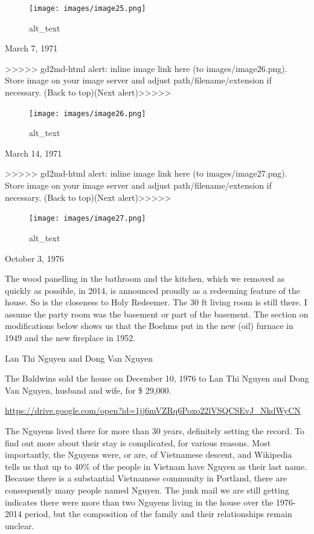 \documentclass[
  12pt,
]{book}
\begin{document}
\begin{figure}
\centering
\texttt{[image: images/image25.png]}
\caption{alt\_text}
\end{figure}

March 7, 1971

{\textgreater\textgreater\textgreater\textgreater\textgreater{} gd2md-html alert: inline image link here (to images/image26.png). Store image on your image server and adjust path/filename/extension if necessary. }(Back to top)(Next alert){\textgreater\textgreater\textgreater\textgreater\textgreater{} }

\begin{figure}
\centering
\texttt{[image: images/image26.png]}
\caption{alt\_text}
\end{figure}

March 14, 1971

{\textgreater\textgreater\textgreater\textgreater\textgreater{} gd2md-html alert: inline image link here (to images/image27.png). Store image on your image server and adjust path/filename/extension if necessary. }(Back to top)(Next alert){\textgreater\textgreater\textgreater\textgreater\textgreater{} }

\begin{figure}
\centering
\texttt{[image: images/image27.png]}
\caption{alt\_text}
\end{figure}

October 3, 1976

The wood panelling in the bathroom and the kitchen, which we removed as quickly as possible, in 2014, is announced proudly as a redeeming feature of the house. So is the closeness to Holy Redeemer. The 30 ft living room is still there. I assume the party room was the basement or part of the basement. The section on modifications below shows us that the Boehms put in the new (oil) furnace in 1949 and the new fireplace in 1952.

Lan Thi Nguyen and Dong Van Nguyen

The Baldwins sold the house on December 10, 1976 to Lan Thi Nguyen and Dong Van Nguyen, husband and wife, for \$ 29,000.

\url{https://drive.google.com/open?id=1jj6mVZRq6Poxo22lVSQCSEvJ_NkdWyCN}

The Nguyens lived there for more than 30 years, definitely setting the record. To find out more about their stay is complicated, for various reasons. Most importantly, the Nguyens were, or are, of Vietnamese descent, and Wikipedia tells us that up to 40\% of the people in Vietnam have Nguyen as their last name. Because there is a substantial Vietnamese community in Portland, there are consequently many people named Nguyen. The junk mail we are still getting indicates there were more than two Nguyens living in the house over the 1976-2014 period, but the composition of the family and their relationships remain unclear.
\end{document}
